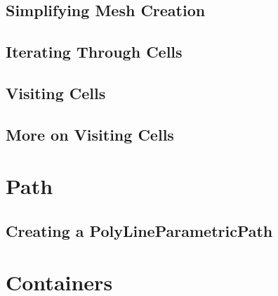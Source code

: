 %


\subsection{Simplifying Mesh Creation}
\label{sec:AutomaticMesh}

%


\subsection{Iterating Through Cells}
\label{sec:MeshCellsIteration}

%


\subsection{Visiting Cells}
\label{sec:MeshCellVisitor}

%


\subsection{More on Visiting Cells}
\label{sec:MeshCellVisitorMultipleType}

%




\section{Path}\label{PathSection}

\subsection{Creating a PolyLineParametricPath}
\label{sec:CreatingAPolyLineParametricPath}

%

\section{Containers}\label{ContainersSection}
\label{sec:TreeContainer}
%



